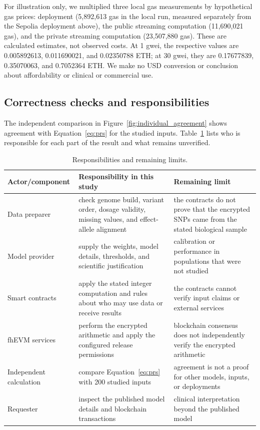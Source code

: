 \documentclass[10pt]{article}
\begin{document}
For illustration only, we multiplied three local gas measurements by hypothetical gas
prices: deployment (5,892,613 gas in the local run, measured separately from the Sepolia
deployment above), the public streaming computation (11,690,021 gas), and the private
streaming computation (23,507,880 gas).  These are calculated estimates,
not observed costs.  At 1 gwei, the respective values are 0.005892613, 0.011690021,
and 0.02350788 ETH; at 30 gwei, they are 0.17677839, 0.35070063, and 0.7052364 ETH.
We make no USD conversion or conclusion about affordability or clinical or commercial use.

\subsection{Correctness checks and responsibilities}

The independent comparison in Figure~\ref{fig:individual_agreement} shows agreement
with Equation~\ref{eq:prs} for the studied inputs.  Table~\ref{tab:correctness_boundary}
lists who is responsible for each part of the result and what remains unverified.

\begin{table}[t]
\centering
\caption{Responsibilities and remaining limits.}
\label{tab:correctness_boundary}
\small
\begin{tabularx}{\textwidth}{@{}p{3.2cm}XX@{}}
\toprule
\textbf{Actor/component} & \textbf{Responsibility in this study} & \textbf{Remaining limit} \\
\midrule
Data preparer & check genome build, variant order, dosage validity, missing values, and effect-allele alignment & the contracts do not prove that the encrypted SNPs came from the stated biological sample \\
Model provider & supply the weights, model details, thresholds, and scientific justification & calibration or performance in populations that were not studied \\
Smart contracts & apply the stated integer computation and rules about who may use data or receive results & the contracts cannot verify input claims or external services \\
fhEVM services & perform the encrypted arithmetic and apply the configured release permissions & blockchain consensus does not independently verify the encrypted arithmetic \\
Independent calculation & compare Equation~\ref{eq:prs} with 200 studied inputs & agreement is not a proof for other models, inputs, or deployments \\
Requester & inspect the published model details and blockchain transactions & clinical interpretation beyond the published model \\
\bottomrule
\end{tabularx}
\end{table}
\end{document}
